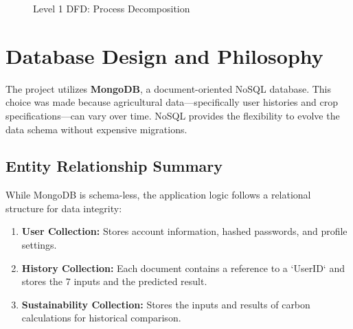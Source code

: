 \documentclass[12pt,a4paper]{report}
\begin{document}
\begin{figure}[H]
    \centering
    \caption{Level 1 DFD: Process Decomposition}
    \label{fig:dfd1}
\end{figure}

\section{Database Design and Philosophy}
The project utilizes \textbf{MongoDB}, a document-oriented NoSQL database. This choice was made because agricultural data—specifically user histories and crop specifications—can vary over time. NoSQL provides the flexibility to evolve the data schema without expensive migrations.

\subsection{Entity Relationship Summary}
While MongoDB is schema-less, the application logic follows a relational structure for data integrity:
\begin{enumerate}
    \item \textbf{User Collection:} Stores account information, hashed passwords, and profile settings.
    \item \textbf{History Collection:} Each document contains a reference to a `UserID` and stores the 7 inputs and the predicted result.
    \item \textbf{Sustainability Collection:} Stores the inputs and results of carbon calculations for historical comparison.
\end{enumerate}
\end{document}
